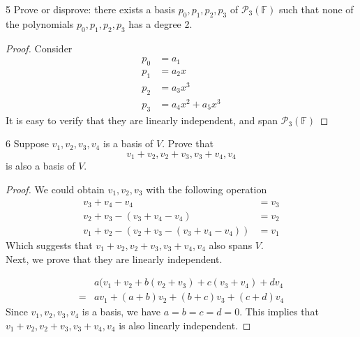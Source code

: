 \documentclass{article}
\newenvironment{problem}[1]{\begin{prob*}{#1}{}}{\end{prob*}}
\newcommand{\F}{\mathbb{F}}
\begin{document}
\begin{problem}{5}
Prove or disprove: there exists a basis \(p_0, p_1, p_2, p_3\) of \(\mathcal{P}_3 (\F)\)
such that none of the polynomials \(p_0, p_1, p_2, p_3\) has a degree 2.
\end{problem}
\begin{proof}
	Consider
	\begin{align*}
		p_0 & = a_1               \\
		p_1 & = a_2 x             \\
		p_2 & = a_3 x^3           \\
		p_3 & = a_4 x^2 + a_5 x^3
	\end{align*}
	It is easy to verify that they are linearly independent, and span $\mathcal{P}_3(\F)$
\end{proof}

\begin{problem}{6}
Suppose \(v_{1}, v_{2}, v_{3}, v_{4}\) is a basis of $V$. Prove that \[
	v_{1} + v_{2}, v_{2} + v_{3}, v_{3} + v_{4}, v_{4}\]
is also a basis of $V$.
\end{problem}
\begin{proof}
	We could obtain \(v_{1}, v_{2}, v_{3}\) with the following operation
	\begin{align}
		v_{3} + v_{4} - v_{4}                                     & = v_{3} \\
		v_{2} + v_{3} - (v_{3} + v_{4} - v_{4})                   & = v_{2} \\
		v_{1} + v_{2} - (v_{2} + v_{3} - (v_{3} + v_{4} - v_{4})) & = v_{1}
	\end{align}
	Which suggests that \(v_{1} + v_{2}, v_{2} + v_{3}, v_{3} + v_{4}, v_{4}\)
	also spans $V$. \\
	Next, we prove that they are linearly independent.

	\begin{align}
		  & a(v_{1} + v_{2} + b ( v_{2} + v_{3} ) + c (v_{3} + v_{4}) + d v_{4} \\
		= & a v_{1} + (a + b) v_{2} + (b + c) v_{3} + (c + d) v_{4}
	\end{align}
	Since \(v_{1}, v_{2}, v_{3}, v_{4}\) is a basis, we have \(a = b = c = d = 0\).
	This implies that \(v_{1} + v_{2}, v_{2} + v_{3}, v_{3} + v_{4}, v_{4}\)
	is also linearly independent.
\end{proof}
\end{document}
